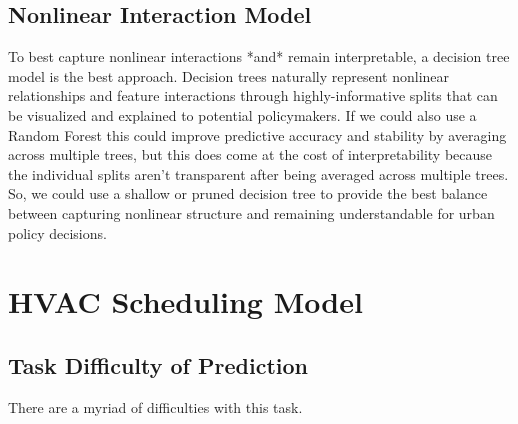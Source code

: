 \documentclass[12pt]{article}
\begin{document}
\subsection{Nonlinear Interaction Model}

To best capture nonlinear interactions *and* remain interpretable, a decision tree model is the best approach.
Decision trees naturally represent nonlinear relationships and feature interactions through highly-informative splits
that can be visualized and explained to potential policymakers. If we could also use a Random Forest this could improve
predictive accuracy and stability by averaging across multiple trees, but this does come at the cost of
interpretability because the individual splits aren't transparent after being averaged across multiple trees. So,
we could use a shallow or pruned decision tree to provide the best balance between capturing nonlinear structure and
remaining understandable for urban policy decisions.

\section{HVAC Scheduling Model}

\subsection{Task Difficulty of Prediction}

There are a myriad of difficulties with this task. 
\end{document}
